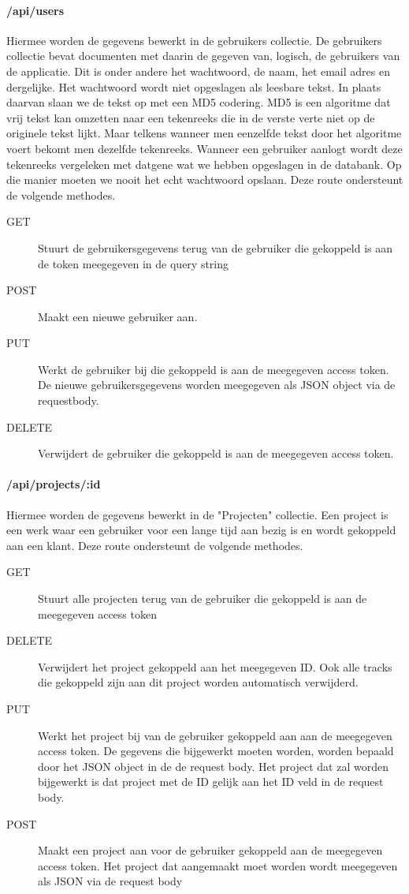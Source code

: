 \documentclass[a4paper,11pt]{article}
\begin{document}
\paragraph{/api/users}
Hiermee worden de gegevens bewerkt in de gebruikers collectie. De gebruikers collectie bevat documenten met daarin de gegeven van, logisch, de gebruikers van de applicatie. Dit is onder andere het wachtwoord, de naam, het email adres en dergelijke. Het wachtwoord wordt niet opgeslagen als leesbare tekst. In plaats daarvan slaan we de tekst op met een MD5 codering. MD5 is een algoritme dat vrij tekst kan omzetten naar een tekenreeks die in de verste verte niet op de originele tekst lijkt. Maar telkens wanneer men eenzelfde tekst door het algoritme voert bekomt men dezelfde tekenreeks. Wanneer een gebruiker aanlogt wordt deze tekenreeks vergeleken met datgene wat we hebben opgeslagen in de databank. Op die manier moeten we nooit het echt wachtwoord opslaan. Deze route ondersteunt de volgende methodes.

\begin{description}
\item[GET] Stuurt de gebruikersgegevens terug van de gebruiker die gekoppeld is aan de token meegegeven in de query string
\item[POST] Maakt een nieuwe gebruiker aan.
\item[PUT] Werkt de gebruiker bij die gekoppeld is aan de meegegeven access token. De nieuwe gebruikersgegevens worden meegegeven als JSON object via de requestbody.
\item[DELETE] Verwijdert de gebruiker die gekoppeld is aan de meegegeven access token.
\end{description}

\paragraph{/api/projects/:id}
Hiermee worden de gegevens bewerkt in de "Projecten" collectie. Een project is een werk waar een gebruiker voor een lange tijd aan bezig is en wordt gekoppeld aan een klant. Deze route ondersteunt de volgende methodes.

\begin{description}
\item[GET] Stuurt alle projecten terug van de gebruiker die gekoppeld is aan de meegegeven access token
\item[DELETE] Verwijdert het project gekoppeld aan het meegegeven ID. Ook alle tracks die gekoppeld zijn aan dit project worden automatisch verwijderd.
\item[PUT] Werkt het project bij van de gebruiker gekoppeld aan aan de meegegeven access token. De gegevens die bijgewerkt moeten worden, worden bepaald door het JSON object in de de request body. Het project dat zal worden bijgewerkt is dat project met de ID gelijk aan het ID veld in de request body.
\item[POST] Maakt een project aan voor de gebruiker gekoppeld aan de meegegeven access token. Het project dat aangemaakt moet worden wordt meegegeven als JSON via de request body
\end{description}
\end{document}
